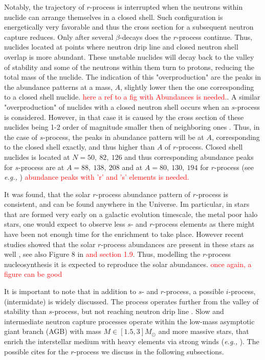 \documentclass[11pt,a4paper,headinclude=true,DIV=14,BCOR=8mm,chapterprefix,listof=totoc,twoside,openright,abstracton]{scrbook}
\begin{document}
Notably, the trajectory of $r$-process is interrupted when the neutrons within nuclide can arrange themselves in a closed shell. Such configuration is energetically very favorable and thus the cross section for a subsequent neutron capture reduces. Only after several $\beta$-decays does the $r$-process continue. Thus, nuclides located at points where neutron drip line and closed neutron shell overlap is more abundant. These unstable nuclides will decay back to the valley of stability and some of the neutrons within them turn to protons, reducing the total mass of the nuclide. The indication of this "overproduction" are the peaks in the abundance patterns at a mass, $A$, slightly lower then the one corresponding to a closed shell nuclide. \textcolor{red}{here a ref to a fig with Abundances is needed.}. 
A similar "overproduction" of nuclides with a closed neutron shell occurs when an $s$-process is considered. However, in that case it is caused by the cross section of these nuclides being 1-2 order of magnitude smaller then of neighboring ones \cite{Rolfs:1988}. Thus, in the case of $s$-process, the peaks in abundance pattern will be at $A$, corresponding to the closed shell  exactly, and thus higher than $A$ of $r$-process. 
Closed shell nuclides is located at $N=50,\: 82, \: 126$ and thus corresponding abundance peaks for $s$-process are at $A=88, \: 138, \: 208$ and at $A=80,\:130,\:194$ for $r$-process (see \textit{e.g.,} \cite{Arnould:2007gh}) \textcolor{red}{abundance peaks with 'r' and 's' elements is needed.}

It was found, that the solar $r$-process abundance pattern of $r$-process is consistent, and can be found anywhere in the Universe. Im particular, in stars that are formed very early on a galactic evolution timescale, the metal poor halo stars, one would expect to observe less $s$- and $r$-process elements as there might have been not enough time for the enrichment to take place. However recent studies showed that the solar $r$-process abundances are present in these stars as well \cite{Sneden:2008,Roederer:2010}, see also Figure 8 in \cite{Sneden:2009} \textcolor{red}{and section 1.9}. Thus, modelling the $r$-process nucleosynthesis it is expected to reproduce the solar abundances. \textcolor{red}{once again, a figure can be good}

It is important to note that in addition to $s$- and $r$-process, a possible $i$-process, (intermidate) is widely discussed. The process operates further from the valley of stability than $s$-process, but not reaching neutron drip line \cite{Cowan:1977,Bertolli:2013gka}. Slow and intermediate neutron capture processes operate within the low-mass asymptotic giant branch (AGB) with mass $M\in[1.5,3]M_{\odot}$ and more massive stars, that enrich the interstellar medium with heavy elements via strong winds (\textit{e.g.,} \cite{Peters:1968,Couch:1974,Kaeppeler:1994K,Woosley:2002,Straniero:2005hc,Herwig:2011}). The possible cites for the $r$-process we discuss in the following subsections.
\end{document}
